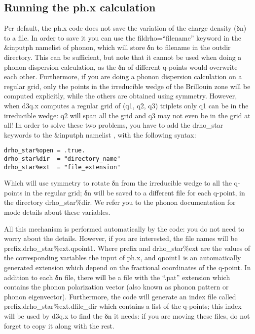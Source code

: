 \documentclass[
]{article}
\begin{document}
\hypertarget{running-the-ph.x-calculation}{%
\subsection{Running the ph.x
calculation}\label{running-the-ph.x-calculation}}

Per default, the ph.x code does not save the variation of the charge
density (δn) to a file. In order to save it you can use the
fildrho=\enquote{filename} keyword in the \&inputph namelist of phonon,
which will store δn to filename in the outdir directory. This can be
sufficient, but note that it cannot be used when doing a phonon
dispersion calculation, as the δn of different q-points would overwrite
each other. Furthermore, if you are doing a phonon dispersion
calculation on a regular grid, only the points in the irreducible wedge
of the Brillouin zone will be computed explicitly, while the others are
obtained using symmetry. However, when d3q.x computes a regular grid of
(q1, q2, q3) triplets only q1 can be in the irreducible wedge: q2 will
span all the grid and q3 may not even be in the grid at all! In order to
solve these two problems, you have to add the drho\_star keywords to the
\&inputph namelist , with the following syntax:

\begin{verbatim}
drho_star%open = .true.
drho_star%dir  = "directory_name"
drho_star%ext  = "file_extension"
\end{verbatim}

Which will use symmetry to rotate δn from the irreducible wedge to all
the q-points in the regular grid; δn will be saved to a different file
for each q-point, in the directory drho\_star\%dir. We refer you to the
phonon documentation for mode details about these variables.

All this mechanism is performed automatically by the code: you do not
need to worry about the details. However, if you are interested, the
file names will be prefix.drho\_star\%ext.qpoint1. Where prefix and
drho\_star\%ext are the values of the corresponding variables the input
of ph.x, and qpoint1 is an automatically generated extension which
depend on the fractional coordinates of the q-point. In addition to each
δn file, there will be a file with the \enquote{.pat} extension which
contains the phonon polarization vector (also known as phonon pattern or
phonon eigenvector). Furthermore, the code will generate an index file
called prefix.drho\_star\%ext.dfile\_dir which contains a list of the
q-points; this index will be used by d3q.x to find the δn it needs: if
you are moving these files, do not forget to copy it along with the
rest.
\end{document}
